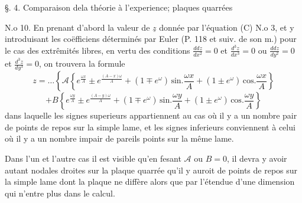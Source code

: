 \documentclass[11pt,a4paper]{article}
\begin{document}

§. 4. Comparaison dela théorie à l'experience; \struck{\ill{}}    plaques quarrées

N.o 10. En prenant d'abord la valeur de $\underline{z}$ donnée par l'équation
(C) N.o 3, et y introduisant les coëfficiens déterminés par Euler (P. 118 et suiv.
de son m.) pour le cas des extrêmités libres, en vertu des conditions
$\frac{ddz}{dx^2}=0$ et $\frac{d^3z}{dx^3}=0$ ou $\frac{ddz}{dy^2}=0$ et $\frac{d^3z}{dy^3}=0$, on trouvera
la formule
\[ z = \ldots\left\{\mathcal{A}\left\{e^{\frac{\omega x}{A}} \pm e^{\frac{(A-x)\omega}{A}} + (1\mp e^{\omega})\,\text{sin}.\frac{\omega x}{A} + (1\pm e^{\omega})\,\text{cos}.\frac{\omega x}{A}\right\}\right. \]
\[ \left. + B\left\{e^{\frac{\omega y}{A}} \pm e^{\frac{(A-y)\omega}{A}} + (1\mp e^{\omega})\,\text{sin}.\frac{\omega y}{A} + (1\pm e^{\omega})\,\text{cos}.\frac{\omega y}{A}\right\}\right. \]
dans laquelle les signes superieurs appartiennent au cas où il y a
un nombre pair de points de repos sur la simple lame, et  les signes
inferieurs conviennent à celui où il y a un nombre impair de pareils
points sur la même lame.

Dans l'un et l'autre cas il est visible qu'en fesant $\mathcal{A}$ ou
$B=0$, il devra y avoir autant  nodales droites sur la plaque
quarrée qu'il y auroit \struck{\ill{}} de points de repos sur la simple lame
dont la plaque ne diffère alors que par l'étendue d'une
dimension qui n'entre plus dans le calcul.
\end{document}
